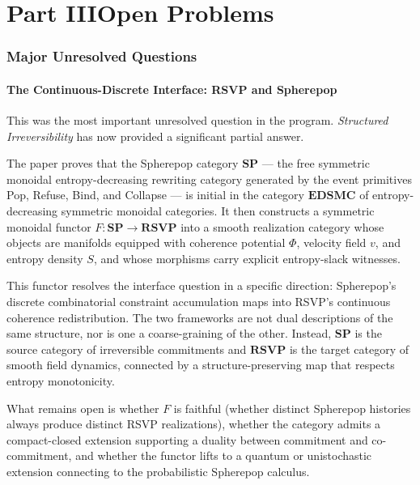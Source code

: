 \documentclass[12pt, twoside]{article}
\begin{document}
\part*{Part III\quad Open Problems}

\section{Major Unresolved Questions}

\subsection{The Continuous-Discrete Interface: RSVP and Spherepop}

This was the most important unresolved question in the program. \emph{Structured Irreversibility} has now provided a significant partial answer.

The paper proves that the Spherepop category $\mathbf{SP}$ --- the free symmetric monoidal entropy-decreasing rewriting category generated by the event primitives Pop, Refuse, Bind, and Collapse --- is initial in the category $\mathbf{EDSMC}$ of entropy-decreasing symmetric monoidal categories. It then constructs a symmetric monoidal functor $F: \mathbf{SP} \to \mathbf{RSVP}$ into a smooth realization category whose objects are manifolds equipped with coherence potential $\Phi$, velocity field $v$, and entropy density $S$, and whose morphisms carry explicit entropy-slack witnesses.

This functor resolves the interface question in a specific direction: Spherepop's discrete combinatorial constraint accumulation maps into RSVP's continuous coherence redistribution. The two frameworks are not dual descriptions of the same structure, nor is one a coarse-graining of the other. Instead, $\mathbf{SP}$ is the source category of irreversible commitments and $\mathbf{RSVP}$ is the target category of smooth field dynamics, connected by a structure-preserving map that respects entropy monotonicity.

What remains open is whether $F$ is faithful (whether distinct Spherepop histories always produce distinct RSVP realizations), whether the category admits a compact-closed extension supporting a duality between commitment and co-commitment, and whether the functor lifts to a quantum or unistochastic extension connecting to the probabilistic Spherepop calculus.
\end{document}
